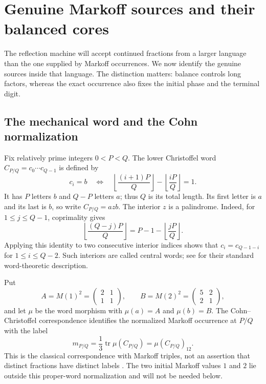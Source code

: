 \section{Genuine Markoff sources and their balanced cores}\label{sec:markoff-sources}

The reflection machine will accept continued fractions from a larger
language than the one supplied by Markoff occurrences. We now identify
the genuine sources inside that language. The distinction matters:
balance controls long factors, whereas the exact occurrence also fixes
the initial phase and the terminal digit.

\subsection{The mechanical word and the Cohn normalization}

Fix relatively prime integers $0<P<Q$. The lower Christoffel word
$C_{P/Q}=c_0\cdots c_{Q-1}$ is defined by
\begin{equation}\label{eq:source-mechanical}
 c_i=b\quad\Longleftrightarrow\quad
 \left\lfloor\frac{(i+1)P}{Q}\right\rfloor
 -\left\lfloor\frac{iP}{Q}\right\rfloor=1.
\end{equation}
It has $P$ letters $b$ and $Q-P$ letters $a$; thus $Q$ is its
total length. Its first letter is $a$ and its last is $b$, so write
$C_{P/Q}=azb$. The interior $z$ is a palindrome. Indeed, for
$1\leqslant j\leqslant Q-1$, coprimality gives
$$
 \left\lfloor\frac{(Q-j)P}{Q}\right\rfloor
 =P-1-\left\lfloor\frac{jP}{Q}\right\rfloor.
$$
Applying this identity to two consecutive interior indices shows that
$c_i=c_{Q-1-i}$ for $1\leqslant i\leqslant Q-2$.
Such interiors are called central words; see
\cite{BertheDeLucaReutenauer2008} for their standard word-theoretic
description.

Put
\begin{equation}\label{eq:source-cohn-matrices}
 A=M(1)^2=\begin{pmatrix}2&1\\1&1\end{pmatrix},\qquad
 B=M(2)^2=\begin{pmatrix}5&2\\2&1\end{pmatrix},
\end{equation}
and let $\mu$ be the word morphism with $\mu(a)=A$ and $\mu(b)=B$.
The Cohn--Christoffel correspondence identifies the normalized
Markoff occurrence at $P/Q$ with the label
\begin{equation}\label{eq:source-label}
 m_{P/Q}=\frac13\operatorname{tr}\mu(C_{P/Q})
        =\mu(C_{P/Q})_{12}.
\end{equation}
This is the classical correspondence with Markoff triples, not an
assertion that distinct fractions have distinct labels
\cite{Reutenauer2009}.
The two initial Markoff values $1$ and $2$ lie outside this proper-word
normalization and will not be needed below.

